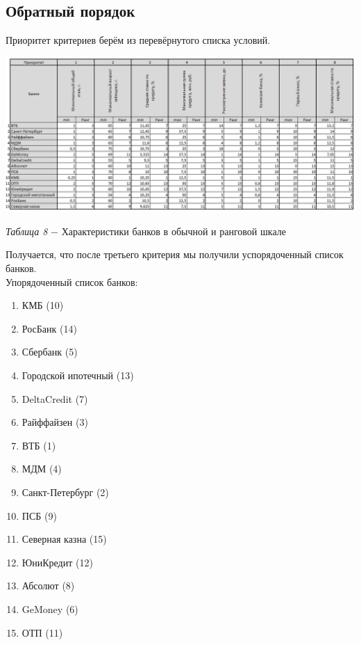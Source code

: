 \documentclass[14pt,fleqn]{extarticle}
\begin{document}
	\subsection*{Обратный порядок}
	Приоритет критериев берём из перевёрнутого списка условий.
	\begin{center}
		\includegraphics[scale=0.55]{10}
	\end{center}
	\begin{center}
		\textit{Таблица 8} $-$ Характеристики банков в обычной и ранговой шкале
	\end{center}
	Получается, что после третьего критерия мы получили успорядоченный список банков.\\
	\newpage
	Упорядоченный список банков:
	\begin{enumerate}[nolistsep]
		\item КМБ (10)
		\item РосБанк (14)
		\item Сбербанк (5)
		\item Городской ипотечный (13)
		\item DeltaCredit (7)
		\item Райффайзен (3)
		\item ВТБ (1)
		\item МДМ (4)
		\item Санкт-Петербург (2)
		\item ПСБ (9)
		\item Северная казна (15)
		\item ЮниКредит (12)
		\item Абсолют (8)
		\item GeMoney (6)
		\item ОТП (11)
	\end{enumerate}
\end{document}
